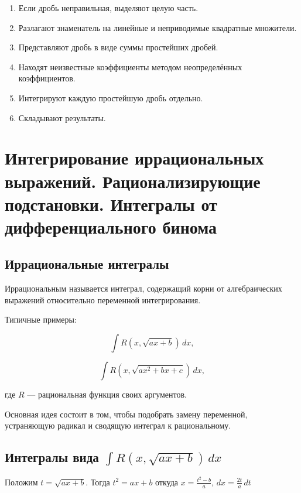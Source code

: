 \documentclass[14pt]{extreport}
\begin{document}
\begin{enumerate}
\item Если дробь неправильная, выделяют целую часть.

\item Разлагают знаменатель на линейные и неприводимые квадратные множители.

\item Представляют дробь в виде суммы простейших дробей.

\item Находят неизвестные коэффициенты методом неопределённых коэффициентов.

\item Интегрируют каждую простейшую дробь отдельно.

\item Складывают результаты.
\end{enumerate}

    \chapter{Интегрирование иррациональных выражений.
Рационализирующие подстановки.
Интегралы от дифференциального бинома}

\section{Иррациональные интегралы}

\begin{definition}
Иррациональным называется интеграл, содержащий корни
от алгебраических выражений относительно переменной интегрирования.
\end{definition}

Типичные примеры:

\[
\int R(x,\sqrt{ax+b})\,dx,
\]

\[
\int R\left(x,\sqrt{ax^2+bx+c}\right)\,dx,
\]

где $R$ --- рациональная функция своих аргументов.

Основная идея состоит в том, чтобы подобрать замену переменной,
устраняющую радикал и сводящую интеграл к рациональному.

\section{Интегралы вида
$\int R(x,\sqrt{ax+b})\,dx$}

Положим $t=\sqrt{ax+b}$. Тогда $t^2=ax+b$
откуда
$x=\frac{t^2-b}{a}$,
$dx=\frac{2t}{a}\,dt$
\end{document}
